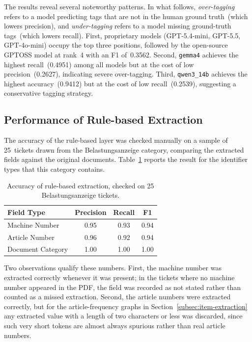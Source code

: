 The results reveal several noteworthy patterns.  In what follows,
\emph{over-tagging} refers to a model predicting tags that are not in the human
ground truth~(which lowers precision), and \emph{under-tagging} refers to a
model missing ground-truth tags~(which lowers recall).  First, proprietary models
(GPT-5.4-mini, GPT-5.5, GPT-4o-mini) occupy the top three positions,
followed by the open-source GPTOSS model at rank~4 with an F1 of~0.3562.
Second, \texttt{gemma4} achieves the highest recall~(0.4951) among all
models but at the cost of low precision~(0.2627), indicating severe
over-tagging.  Third, \texttt{qwen3\_14b} achieves the highest
accuracy~(0.9412) but at the cost of low recall~(0.2539), suggesting a
conservative tagging strategy.

\subsection{Performance of Rule-based Extraction}
\label{subsec:regex-res}
%
The accuracy of the rule-based layer was checked manually on a sample of
25~tickets drawn from the Belastungsanzeige category, comparing the extracted
fields against the original documents.  Table~\ref{tab:regex-results} reports the
result for the identifier types that this category contains.

\begin{table}[H]
    \centering
    \caption{Accuracy of rule-based extraction, checked on 25 Belastungsanzeige tickets.}
    \label{tab:regex-results}
    \begin{tabular}{lccc}
        \hline
        \textbf{Field Type} & \textbf{Precision} & \textbf{Recall} & \textbf{F1} \\
        \hline
        Machine Number        & 0.95 & 0.93 & 0.94 \\
        Article Number        & 0.96 & 0.92 & 0.94 \\
        Document Category     & 1.00 & 1.00 & 1.00 \\
        \hline
    \end{tabular}
\end{table}

Two observations qualify these numbers.  First, the machine number was extracted
correctly whenever it was present; in the tickets where no machine number
appeared in the PDF, the field was recorded as not stated rather than counted as
a missed extraction.  Second, the article numbers were extracted correctly, but
for the article-frequency graphs in Section~\ref{subsec:item-extraction} any
extracted value with a length of two characters or less was discarded, since such
very short tokens are almost always spurious rather than real article numbers.

